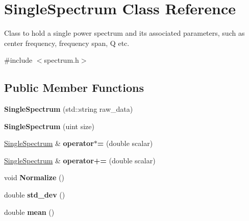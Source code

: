 \hypertarget{class_single_spectrum}{}\section{Single\+Spectrum Class Reference}
\label{class_single_spectrum}


Class to hold a single power spectrum and its associated parameters, such as center frequency, frequency span, Q etc.  




{\ttfamily \#include $<$spectrum.\+h$>$}

\subsection*{Public Member Functions}
\begin{DoxyCompactItemize}
\item 
{\bfseries Single\+Spectrum} (std\+::string raw\+\_\+data)\hypertarget{class_single_spectrum_a4a3601f0303e217a3b58458d5f47c05a}{}\label{class_single_spectrum_a4a3601f0303e217a3b58458d5f47c05a}

\item 
{\bfseries Single\+Spectrum} (uint size)\hypertarget{class_single_spectrum_a964a944ac1fa20c59d18a1aec62ac149}{}\label{class_single_spectrum_a964a944ac1fa20c59d18a1aec62ac149}

\item 
\hyperlink{class_single_spectrum}{Single\+Spectrum} \& {\bfseries operator$\ast$=} (double scalar)\hypertarget{class_single_spectrum_a1036113bfa175f06d75b6b5b0607a41d}{}\label{class_single_spectrum_a1036113bfa175f06d75b6b5b0607a41d}

\item 
\hyperlink{class_single_spectrum}{Single\+Spectrum} \& {\bfseries operator+=} (double scalar)\hypertarget{class_single_spectrum_a324cc374d07ca086f435e8f917eda9ed}{}\label{class_single_spectrum_a324cc374d07ca086f435e8f917eda9ed}

\item 
void {\bfseries Normalize} ()\hypertarget{class_single_spectrum_a938eb09122d2775378a4e100ee8717f4}{}\label{class_single_spectrum_a938eb09122d2775378a4e100ee8717f4}

\item 
double {\bfseries std\+\_\+dev} ()\hypertarget{class_single_spectrum_a138e3db04f9db67a699c8dddfef8f324}{}\label{class_single_spectrum_a138e3db04f9db67a699c8dddfef8f324}

\item 
double {\bfseries mean} ()\hypertarget{class_single_spectrum_a39f66345fd7d6502bbc8ba731cc1bb13}{}\label{class_single_spectrum_a39f66345fd7d6502bbc8ba731cc1bb13}


\end{DoxyCompactItemize}
